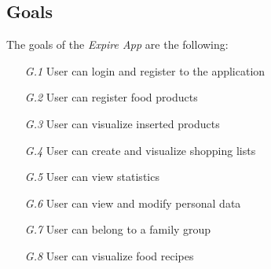 \subsection{Goals}

The goals of the \textit{Expire App} are the following:
\begin{itemize}
    \item [\textit {G.1}]User can login and register to the application
    \item [\textit {G.2}] User can register food products
    \item [\textit {G.3}] User can visualize inserted products
    \item [\textit {G.4}] User can create and visualize shopping lists
    \item [\textit {G.5}] User can view statistics
    \item [\textit {G.6}] User can view and modify personal data
    \item [\textit {G.7}] User can belong to a family group
    \item [\textit {G.8}] User can visualize food recipes
    

\end{itemize}